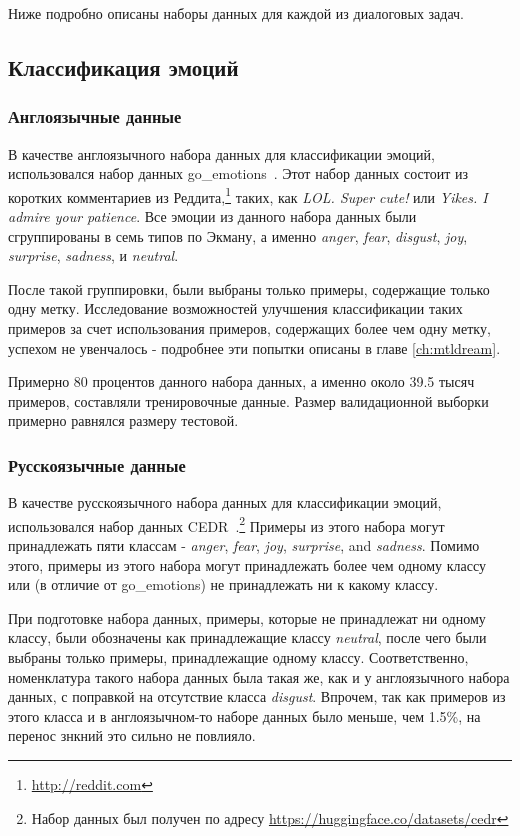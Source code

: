 Ниже подробно описаны наборы данных для каждой из диалоговых задач. 

\subsection{Классификация эмоций}
\subsubsection{Англоязычные данные}
В качестве англоязычного набора данных для классификации эмоций, использовался набор данных {go\_emotions}~\cite{go_emotions}. Этот набор данных состоит из коротких комментариев из Реддита,\footnote{\url{http://reddit.com}} таких, как \textit{LOL. Super cute!} или \textit{Yikes. I admire your patience}. Все эмоции из данного набора данных были сгруппированы в семь типов по Экману, а именно \textit{anger}, \textit{fear}, \textit{disgust}, \textit{joy}, \textit{surprise}, \textit{sadness}, и \textit{neutral}.

После такой группировки, были выбраны только примеры, содержащие только одну метку. Исследование возможностей улучшения классификации таких примеров за счет использования примеров, содержащих более чем одну метку, успехом не увенчалось - подробнее эти попытки описаны в главе \ref{ch:mtldream}. 

Примерно 80 процентов данного набора данных, а именно около 39.5 тысяч примеров, составляли тренировочные данные. Размер валидационной выборки примерно равнялся размеру тестовой. 

\subsubsection{Русскоязычные данные}
В качестве русскоязычного набора данных для классификации эмоций, использовался набор данных {CEDR}~\cite{ru_emotions}.\footnote{Набор данных был получен по адресу \url{https://huggingface.co/datasets/cedr}} Примеры из этого набора могут принадлежать пяти классам - \textit{anger}, \textit{fear}, \textit{joy}, \textit{surprise}, and \textit{sadness}. Помимо этого, примеры из этого набора могут принадлежать более чем одному классу или (в отличие от {go\_emotions}) не принадлежать ни к какому классу.

При подготовке набора данных, примеры, которые не принадлежат ни одному классу, были обозначены как принадлежащие классу \textit{neutral}, после чего были выбраны только примеры, принадлежащие одному классу. Соответственно, номенклатура такого набора данных была такая же, как и у англоязычного набора данных, с поправкой на отсутствие класса \textit{disgust}. Впрочем, так как примеров из этого класса и в англоязычном-то наборе данных было меньше, чем 1.5\%, на перенос знкний это сильно не повлияло. 

